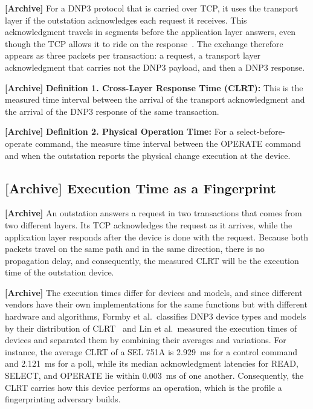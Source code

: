 \documentclass[conference]{IEEEtran}
\begin{document}
\textbf{[Archive]} For a DNP3 protocol that is carried over TCP, it uses the transport layer if the outstation acknowledges each request it receives. This acknowledgment travels in segments before the application layer answers, even though the TCP allows it to ride on the response~\cite{rfc9293}. The exchange therefore appears as three packets per transaction: a request, a transport layer acknowledgment that carries not the DNP3 payload, and then a DNP3 response. 

\textbf{[Archive]} \textbf{Definition 1. Cross-Layer Response Time (CLRT):} This is the measured time interval between the arrival of the transport acknowledgment and the arrival of the DNP3 response of the same transaction.

\textbf{[Archive]} \textbf{Definition 2. Physical Operation Time:} For a select-before-operate command, the measure time interval between the OPERATE command  and when the outstation reports the physical change execution at the device.

\subsection{ \textbf{[Archive]} Execution Time as a Fingerprint}
\textbf{[Archive]} An outstation answers a request in two transactions that comes from two different layers. Its TCP acknowledges the request as it arrives, while the application layer responds after the device is done with the request. Because both packets travel on the same path and in the same direction, there is no propagation delay, and consequently, the measured CLRT will be the execution time  of the outstation device.

\textbf{[Archive]} The execution times differ for devices and models, and since different vendors have their own implementations for the same functions but with different hardware and algorithms, Formby et al.\ classifies DNP3 device types and models by their distribution of CLRT~\cite{formby2016} and Lin et al.\ measured the execution times of devices and separated them by combining their averages and variations. For instance, the average CLRT of a SEL 751A is 2.929~ms for a control command and 2.121~ms for a poll, while its median acknowledgment latencies for READ, SELECT, and OPERATE lie within 0.003~ms of one another. Consequently, the CLRT carries how this device performs an operation, which is the profile a fingerprinting adversary builds.
\end{document}
